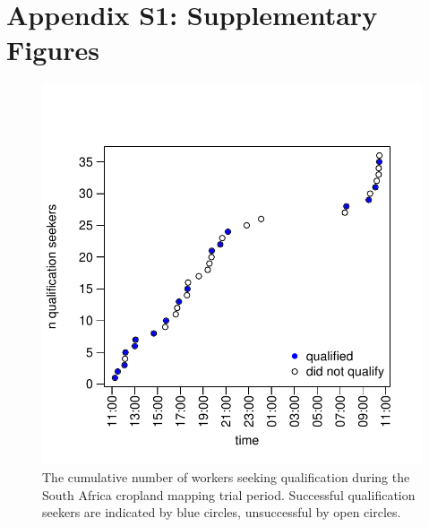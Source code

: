 \documentclass[preprint,12pt,authoryear]{elsarticle}
\begin{document}
\section*{\large Appendix S1: Supplementary Figures}

\begin{figure}[!ht]
       \begin{center}
      \includegraphics[scale=1]{figures/figS1.pdf} 
        \end{center}
      \caption{The cumulative number of workers seeking qualification during the South Africa cropland mapping trial period. Successful qualification seekers are indicated by blue circles, unsuccessful by open circles.}
      \label{fig:default}
\end{figure}
\end{document}
